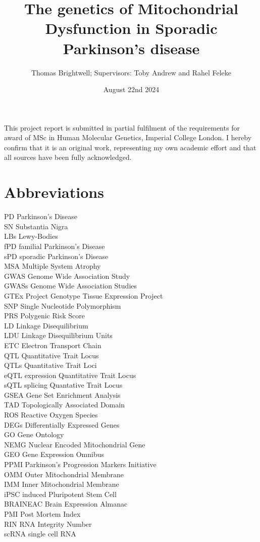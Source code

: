 \documentclass{article}
\title{The genetics of Mitochondrial Dysfunction in Sporadic Parkinson's disease}
\author{Thomas Brightwell; Supervisors: Toby Andrew and Rahel Feleke}
\date{August 22nd 2024}
\begin{document}
\maketitle
This project
report is submitted in partial fulfilment of the requirements for award of MSc in Human Molecular
Genetics, Imperial College London. I hereby confirm that it is an original work, representing my
own academic effort and that all sources have been fully acknowledged.
\newpage
\begin{abstract}
\end{abstract}
\renewcommand{\abstractname}{Acknowledgements}
\begin{abstract}
\end{abstract}
\newpage
\tableofcontents
\section{Abbreviations}
PD Parkinson's Disease
\\SN Substantia Nigra
\\LBs Lewy-Bodies
\\fPD familial Parkinson's Disease
\\sPD sporadic Parkinson's Disease
\\MSA Multiple System Atrophy
\\GWAS Genome Wide Association Study
\\GWASs Genome Wide Association Studies
\\GTEx Project Genotype Tissue Expression Project
\\SNP Single Nucleotide Polymorphism
\\PRS Polygenic Risk Score
\\LD Linkage Disequilibrium
\\LDU Linkage Disequilibrium Units
\\ETC Electron Transport Chain
\\QTL Quantitative Trait Locus
\\QTLs Quantitative Trait Loci
\\eQTL expression Quantitative Trait Locus
\\sQTL splicing Quantative Trait Locus
\\GSEA Gene Set Enrichment Analysis
\\TAD Topologically Associated Domain
\\ROS Reactive Oxygen Species
\\DEGs Differentially Expressed Genes
\\GO Gene Ontology
\\NEMG Nuclear Encoded Mitochondrial Gene
\\GEO Gene Expression Omnibus
\\PPMI Parkinson's Progression Markers Initiative
\\OMM Outer Mitochondrial Membrane
\\IMM Inner Mitochondrial Membrane
\\iPSC induced Pluripotent Stem Cell
\\BRAINEAC Brain Expression Almanac
\\PMI Post Mortem Index
\\RIN RNA Integrity Number
\\scRNA single cell RNA
\end{document}
